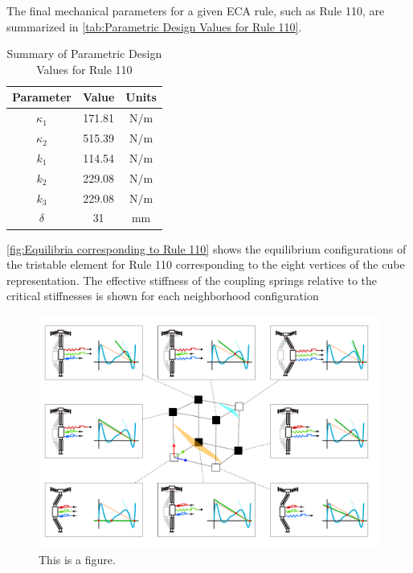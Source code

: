 The final mechanical parameters for a given ECA rule, such as Rule 110, are summarized in \autoref*{tab:Parametric Design Values for Rule 110}.

\begin{table}[h]
\centering
\begin{tabular}{|c|c|c|}
\hline
Parameter & Value & Units \\
\hline
\( \kappa_1 \) & 171.81 & \( \text{N/m} \) \\
\( \kappa_2 \) & 515.39 & \( \text{N/m} \) \\
\( k_1 \) & 114.54 & \( \text{N/m} \) \\
\( k_2 \) & 229.08 & \( \text{N/m} \) \\
\( k_3 \) & 229.08 & \( \text{N/m} \) \\
\( \delta \) & 31 & \( \text{mm} \) \\
\hline
\end{tabular}
\caption{Summary of Parametric Design Values for Rule 110}
\label{tab:Parametric Design Values for Rule 110}
\end{table}

\autoref*{fig:Equilibria corresponding to Rule 110} shows the equilibrium configurations of the tristable element for Rule 110 corresponding to the eight vertices of the cube representation. The effective stiffness of the coupling springs relative to the critical stiffnesses is shown for each neighborhood configuration

\begin{figure}[H]
    \centering
    \includegraphics[width=\textwidth]{images/SVGs/Equilibria3.pdf}
    \caption{This is a figure.}
    \label{fig:Equilibria corresponding to Rule 110}
\end{figure}


